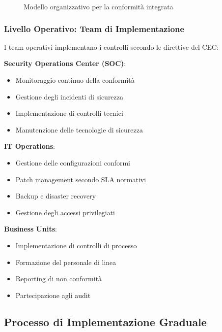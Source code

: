 \begin{figure}[h]
\centering
{}
\caption{Modello organizzativo per la conformità integrata}
\label{fig:org_structure}
\end{figure}

\subsubsection{Livello Operativo: Team di Implementazione}

I team operativi implementano i controlli secondo le direttive del CEC:

\textbf{Security Operations Center (SOC)}:
\begin{itemize}
    \item Monitoraggio continuo della conformità
    \item Gestione degli incidenti di sicurezza
    \item Implementazione di controlli tecnici
    \item Manutenzione delle tecnologie di sicurezza
\end{itemize}

\textbf{IT Operations}:
\begin{itemize}
    \item Gestione delle configurazioni conformi
    \item Patch management secondo SLA normativi
    \item Backup e disaster recovery
    \item Gestione degli accessi privilegiati
\end{itemize}

\textbf{Business Units}:
\begin{itemize}
    \item Implementazione di controlli di processo
    \item Formazione del personale di linea
    \item Reporting di non conformità
    \item Partecipazione agli audit
\end{itemize}

\subsection{Processo di Implementazione Graduale}
\label{subsec:4.6.2_implementazione}

